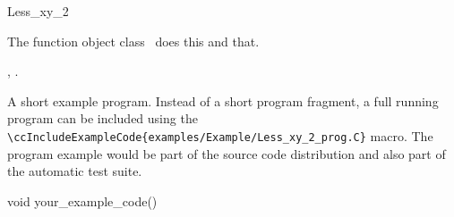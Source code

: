 

\begin{ccRefFunctionObjectClass}{Less_xy_2}  %


\ccDefinition
  
The function object class \ccRefName\ does this and that.


\ccIsModel


\ccTypes


\ccCreation
{}  %


\ccOperations


\ccSeeAlso

,
.

\ccExample

A short example program.
Instead of a short program fragment, a full running program can be
included using the 
\verb|\ccIncludeExampleCode{examples/Example/Less_xy_2_prog.C}| 
macro. The program example would be part of the source code distribution and
also part of the automatic test suite.

\begin{ccExampleCode}
void your_example_code() {
}
\end{ccExampleCode}


\end{ccRefFunctionObjectClass}


